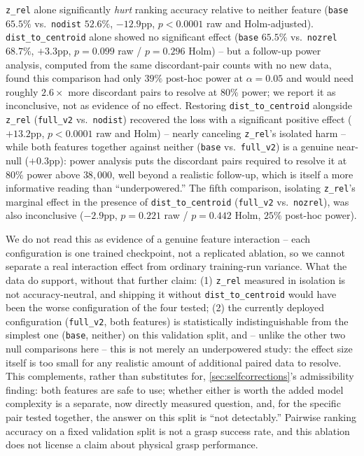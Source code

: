 \documentclass[journal]{IEEEtran}
\begin{document}
\texttt{z\_rel} alone significantly \emph{hurt} ranking accuracy
relative to neither feature (\texttt{base} $65.5\%$ vs.\ \texttt{nodist}
$52.6\%$, $-12.9$pp, $p{<}0.0001$ raw and Holm-adjusted).
\texttt{dist\_to\_centroid} alone showed no significant effect
(\texttt{base} $65.5\%$ vs.\ \texttt{nozrel} $68.7\%$, $+3.3$pp,
$p{=}0.099$ raw / $p{=}0.296$ Holm) -- but a follow-up power analysis,
computed from the same discordant-pair counts with no new data, found
this comparison had only $39\%$ post-hoc power at $\alpha{=}0.05$ and
would need roughly $2.6\times$ more discordant pairs to resolve at
$80\%$ power; we report it as inconclusive, not as evidence of no
effect. Restoring \texttt{dist\_to\_centroid} alongside \texttt{z\_rel}
(\texttt{full\_v2} vs.\ \texttt{nodist}) recovered the loss with a
significant positive effect ($+13.2$pp, $p{<}0.0001$ raw and Holm) --
nearly canceling \texttt{z\_rel}'s isolated harm -- while both features
together against neither (\texttt{base} vs.\ \texttt{full\_v2}) is a
genuine near-null ($+0.3$pp): power analysis puts the discordant pairs
required to resolve it at $80\%$ power above $38{,}000$, well beyond a
realistic follow-up, which is itself a more informative reading than
``underpowered.'' The fifth comparison, isolating \texttt{z\_rel}'s
marginal effect in the presence of \texttt{dist\_to\_centroid}
(\texttt{full\_v2} vs.\ \texttt{nozrel}), was also inconclusive
($-2.9$pp, $p{=}0.221$ raw / $p{=}0.442$ Holm, $25\%$ post-hoc power).

We do not read this as evidence of a genuine feature interaction --
each configuration is one trained checkpoint, not a replicated
ablation, so we cannot separate a real interaction effect from ordinary
training-run variance. What the data do support, without that further
claim: (1) \texttt{z\_rel} measured in isolation is not
accuracy-neutral, and shipping it without \texttt{dist\_to\_centroid}
would have been the worse configuration of the four tested; (2) the
currently deployed configuration (\texttt{full\_v2}, both features) is
statistically indistinguishable from the simplest one (\texttt{base},
neither) on this validation split, and -- unlike the other two null
comparisons here -- this is not merely an underpowered study: the
effect size itself is too small for any realistic amount of additional
paired data to resolve. This complements, rather than substitutes for,
\cref{sec:selfcorrections}'s admissibility finding: both features are
safe to use; whether either is worth the added model complexity is a
separate, now directly measured question, and, for the specific pair
tested together, the answer on this split is ``not detectably.''
Pairwise ranking accuracy on a fixed validation split is not a grasp
success rate, and this ablation does not license a claim about physical
grasp performance.
\end{document}
